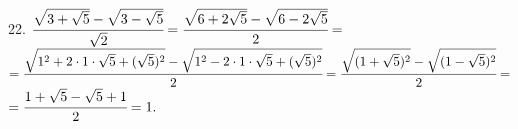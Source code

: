 22. $\cfrac{\sqrt{3+\sqrt{5}}-\sqrt{3-\sqrt{5}}}{\sqrt{2}}=\cfrac{\sqrt{6+2\sqrt{5}}-\sqrt{6-2\sqrt{5}}}{2}=$\\$=
\cfrac{\sqrt{1^2+2\cdot1\cdot\sqrt{5}+(\sqrt{5})^2}-\sqrt{1^2-2\cdot1\cdot\sqrt{5}+(\sqrt{5})^2}}{2}=
\cfrac{\sqrt{(1+\sqrt{5})^2}-\sqrt{(1-\sqrt{5})^2}}{2}=$\\$=\cfrac{1+\sqrt{5}-\sqrt{5}+1}{2}=1.$\\

